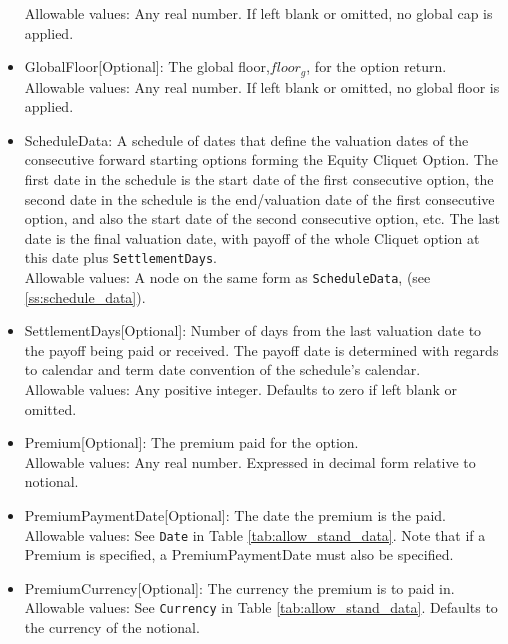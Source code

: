 \begin{itemize}
	Allowable values: Any real number. If left blank or omitted, no global cap is applied.
	\item GlobalFloor[Optional]: The global floor,$floor_{g}$, for the option return. \\
	Allowable values: Any real number. If left blank or omitted, no global floor is applied.
	\item ScheduleData: A schedule of dates that define the valuation dates of the consecutive forward starting options forming the Equity Cliquet Option. The first date in the schedule is the start date of the first consecutive option, the second date in the schedule is the end/valuation date of the first consecutive option, and also the start date of the second consecutive option, etc.  The last date is the final valuation date, with payoff of the whole Cliquet option at this date plus \lstinline!SettlementDays!. \\
	 Allowable values: A node on the same form as \lstinline!ScheduleData!, (see \ref{ss:schedule_data}). 
	\item SettlementDays[Optional]: Number of days from the last valuation date to the payoff being paid or received. The payoff date is determined with regards to calendar and
		   term date convention of the schedule's calendar. \\
	Allowable values: Any positive integer. Defaults to zero if left blank or omitted.
	\item Premium[Optional]: The premium paid for the option. \\
	Allowable values: Any real number. Expressed in decimal form relative to notional.
	\item PremiumPaymentDate[Optional]: The date the premium is the paid. \\
	Allowable values: See \lstinline!Date! in Table \ref{tab:allow_stand_data}. Note that if a Premium is specified, a PremiumPaymentDate must also be specified. 
	\item PremiumCurrency[Optional]: The currency the premium is to paid in. \\
	Allowable values: See \lstinline!Currency! in Table \ref{tab:allow_stand_data}. Defaults to the currency of the notional. 
\end{itemize}
